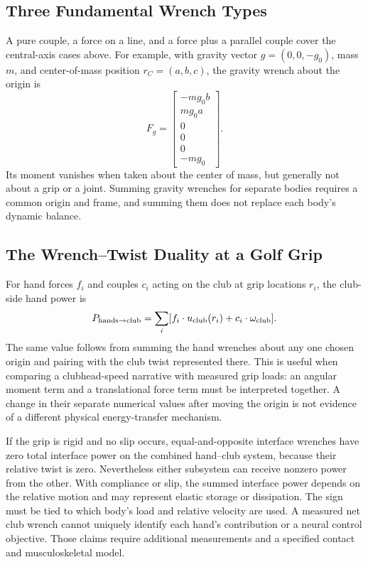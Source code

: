\subsection{Three Fundamental Wrench Types}

A pure couple, a force on a line, and a force plus a parallel couple cover the central-axis cases above. For example, with gravity vector $g=(0,0,-g_0)$, mass $m$, and center-of-mass position $r_C=(a,b,c)$, the gravity wrench about the origin is
\begin{equation}
 F_g=\begin{bmatrix}-mg_0b\\mg_0a\\0\\0\\0\\-mg_0\end{bmatrix}.
\end{equation}
Its moment vanishes when taken about the center of mass, but generally not about a grip or a joint. Summing gravity wrenches for separate bodies requires a common origin and frame, and summing them does not replace each body's dynamic balance.

\subsection{The Wrench--Twist Duality at a Golf Grip}

For hand forces $f_i$ and couples $c_i$ acting on the club at grip locations $r_i$, the club-side hand power is
\begin{equation}
 P_{\rm hands\to club}=\sum_i[f_i\cdot u_{\rm club}(r_i)+c_i\cdot\omega_{\rm club}].
\end{equation}
The same value follows from summing the hand wrenches about any one chosen origin and pairing with the club twist represented there. This is useful when comparing a clubhead-speed narrative with measured grip loads: an angular moment term and a translational force term must be interpreted together. A change in their separate numerical values after moving the origin is not evidence of a different physical energy-transfer mechanism.

If the grip is rigid and no slip occurs, equal-and-opposite interface wrenches have zero total interface power on the combined hand--club system, because their relative twist is zero. Nevertheless either subsystem can receive nonzero power from the other. With compliance or slip, the summed interface power depends on the relative motion and may represent elastic storage or dissipation. The sign must be tied to which body's load and relative velocity are used. A measured net club wrench cannot uniquely identify each hand's contribution or a neural control objective. Those claims require additional measurements and a specified contact and musculoskeletal model.


